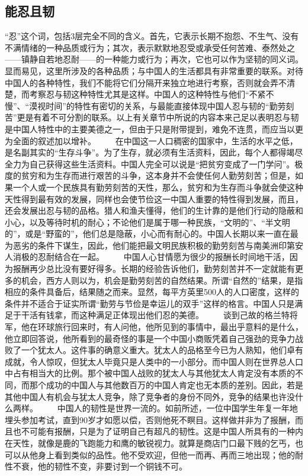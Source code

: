\documentclass[12pt,oneside]{book}
\begin{document}
\begin{common-format}
\chapter{能忍且韧}
“忍”这个词，包括3层完全不同的含义。首先，它表示长期不抱怨、不生气、没有不满情绪的一种品质或行为；其次，表示默默地忍受或承受任何苦难、泰然处之——镇静自若地忍耐——的一种能力或行为；再次，它也可以作为坚韧的同义词。显而易见，这里所涉及的各种品质；与中国人的生活都具有非常重要的联系。对待中国人的各种特性，我们不能将它们分隔开来独立地进行考察，否则就会弄不清楚，而考察忍与韧这种特性尤其是这样。中国人的这种特性与他们“不紧不慢”、“漠视时间”的特性有密切的关系，与最能直接体现中国人忍与韧的“勤劳刻苦”更是有着不可分割的联系。以上有关章节中所说的内容本来己足以表明忍与韧是中国人特性中的主要美德之一，但由于只是附带提到，难免不连贯，而应当以更为全面的叙述加以增补。 
　　在中国这一人口稠密的国家中，生活的水平之低，是名副其实的“生存斗争”。为了生存，就必须有生活资料，因此，每个人都得竭尽全力为自己获得这些生活资料。中国人完全可以说是“把贫穷变成了一门学问”。极度的贫穷和为生存而进行艰苦的斗争，这本身并不会使任何人勤劳刻苦；但是，如果一个人或一个民族具有勤劳刻苦的天性，那么，贫穷和为生存而斗争就会使这种天性得到最有效的发展，同样也会使节俭这一中国人重要的特性得到发展，而且，还会发展出忍与韧的品格。猎人和渔夫懂得，他们的生计靠的是他们行动的隐蔽和小心，以及等待时机的耐心；不论他们是属于哪一种民族，“文明的”、“半文明的”，或是“野蛮的”，他们总是隐蔽，小心而有耐心的。中国人长期以来一直在最为恶劣的条件下谋生，因此，他们能把最文明民族积极的勤劳刻苦与南美洲印第安人消极的忍耐结合在一起。 
　　中国人心甘情愿为很少的报酬长时间地干活，因为报酬再少总比没有要好得多。长期的经验告诉他们，勤劳刻苦并不一定就能有更多的机会，西方人则以为，机会是勤劳刻苦的自然结果。所谓“自然的”结果，是指相应的条件具备后，结果随之而来。显然，每平方英里500人的人口密度，这样的条件并不适合于证实所谓“勤劳与节俭是幸运儿的双手”这样的格言。中国人只是满足于干活有钱拿，而这种满足正体现出他们忍的美德。 
　　谈到己故的格兰特将军，他在环球旅行回来时，有人问他，他所见到的事情中，最出乎意料的是什么，他立即回答说，他所看到的最奇怪的事是一个中国小商贩凭着自己强劲的竞争力战败了一个犹太人。这件事的确意义重大。犹太人的品格至今已为人熟知，他们卓有成就，令人惊叹，但犹太人毕竟只是人类中的一小部分。而中国人则在世界总人口中占有相当大的比例。那个被中国人战败的犹太人与其他犹太人肯定没有本质的不同，而那个成功的中国人与其他数百万的中国人肯定也无本质的差别。因此，若是其他中国人有机会与犹太人竞争，除了竞争者的身份不同外，竞争的结果也许没什么两样。 
　　中国人的韧性是世界一流的。如前所述，一位中国学生年复一年地埋头参加考试，直到90岁才如愿以偿，否则他死不瞑目。这样做并非为了报酬，而且也不可能有报酬，只是为了证明自己有超凡的韧性。这是中国人所具有的一种内在天性，就像是鹿的飞跑能力和鹰的敏锐视力。就算是商店门口最下贱的乞丐，也可以从他身上看到类似的品性。他不受欢迎，但他一而再、再而三地出现；他的耐性不衰，他的韧性不变，非要讨到一个铜钱不可。 

\end{common-format}
\end{document}
